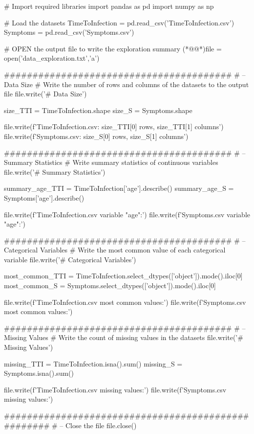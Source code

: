 \documentclass[11pt]{article}
\begin{document}
\begin{python}

# Import required libraries
import pandas as pd
import numpy as np

# Load the datasets
TimeToInfection = pd.read_csv('TimeToInfection.csv')
Symptoms = pd.read_csv('Symptoms.csv')

# OPEN the output file to write the exploration summary
(*@@*)file = open('data_exploration.txt','a')

########################################
# -- Data Size
# Write the number of rows and columns of the datasets to the output file
file.write('# Data Size\n\n')

size_TTI = TimeToInfection.shape 
size_S = Symptoms.shape 

file.write(f'TimeToInfection.csv: {size_TTI[0]} rows, {size_TTI[1]} columns\n')
file.write(f'Symptoms.csv: {size_S[0]} rows, {size_S[1]} columns\n\n')

########################################
# -- Summary Statistics
# Write summary statistics of continuous variables
file.write('# Summary Statistics\n\n')

summary_age_TTI = TimeToInfection['age'].describe()
summary_age_S = Symptoms['age'].describe()

file.write(f'TimeToInfection.csv variable "age":\n')
file.write(f'Symptoms.csv variable "age":\n\n')

########################################
# -- Categorical Variables
# Write the most common value of each categorical variable 
file.write('# Categorical Variables\n\n')

most_common_TTI = TimeToInfection.select_dtypes(['object']).mode().iloc[0]
most_common_S = Symptoms.select_dtypes(['object']).mode().iloc[0]

file.write(f'TimeToInfection.csv most common values:\n')
file.write(f'Symptoms.csv most common values:\n\n')

########################################
# -- Missing Values
# Write the count of missing values in the datasets 
file.write('# Missing Values\n\n')

missing_TTI = TimeToInfection.isna().sum()
missing_S = Symptoms.isna().sum()

file.write(f'TimeToInfection.csv missing values:\n')
file.write(f'Symptoms.csv missing values:\n\n')

###################################################
# -- Close the file
file.close()

\end{python}
\end{document}
